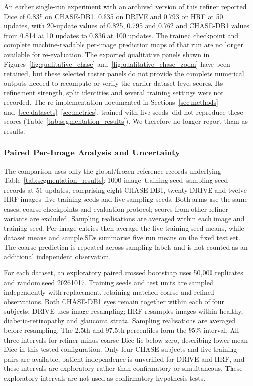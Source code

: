 \documentclass[jimaging,article,submit,pdftex,moreauthors]
  {Definitions/mdpi}
\providecommand{\linelabel}[1]{}
\newcommand{\seclabel}[1]{\linelabel{rev:sec:#1}}
\newcommand{\secend}[1]{\linelabel{rev:end:#1}}
\begin{document}
An earlier single-run experiment with an archived version of this refiner reported Dice of 0.835 on CHASE-DB1, 0.835 on DRIVE and 0.793 on HRF at 50 updates, with 20-update values of 0.825, 0.795 and 0.762 and CHASE-DB1 values from 0.814 at 10 updates to 0.836 at 100 updates. The trained checkpoint and complete machine-readable per-image prediction maps of that run are no longer available for re-evaluation. The exported qualitative panels shown in Figures~\ref{fig:qualitative_chase} and~\ref{fig:qualitative_chase_zoom} have been retained, but these selected raster panels do not provide the complete numerical outputs needed to recompute or verify the earlier dataset-level scores. Its refinement strength, split identities and several training settings were not recorded. The re-implementation documented in Sections~\ref{sec:methods} and~\ref{sec:datasets}--\ref{sec:metrics}, trained with five seeds, did not reproduce these scores (Table~\ref{tab:segmentation_results}). We therefore no longer report them as results.\secend{quantitative}
\subsubsection{Paired Per-Image Analysis and Uncertainty}
\label{sec:paired_per_image}
\seclabel{paired_per_image}
The comparison uses only the global/frozen reference records underlying Table~\ref{tab:segmentation_results}: 1000 image--training-seed--sampling-seed records at 50 updates, comprising eight CHASE-DB1, twenty DRIVE and twelve HRF images, five training seeds and five sampling seeds. Both arms use the same cases, coarse checkpoints and evaluation protocol; scores from other refiner variants are excluded. Sampling realisations are averaged within each image and training seed. Per-image entries then average the five training-seed means, while dataset means and sample SDs summarise five run means on the fixed test set. The coarse prediction is repeated across sampling labels and is not counted as an additional independent observation.

For each dataset, an exploratory paired crossed bootstrap uses 50,000 replicates and random seed 20261017. Training seeds and test units are sampled independently with replacement, retaining matched coarse and refined observations. Both CHASE-DB1 eyes remain together within each of four subjects; DRIVE uses image resampling; HRF resamples images within healthy, diabetic-retinopathy and glaucoma strata. Sampling realisations are averaged before resampling. The 2.5th and 97.5th percentiles form the 95\% interval. All three intervals for refiner-minus-coarse Dice lie below zero, describing lower mean Dice in this tested configuration. Only four CHASE subjects and five training pairs are available, patient independence is unverified for DRIVE and HRF, and these intervals are exploratory rather than confirmatory or simultaneous. These exploratory intervals are not used as confirmatory hypothesis tests.
\end{document}
